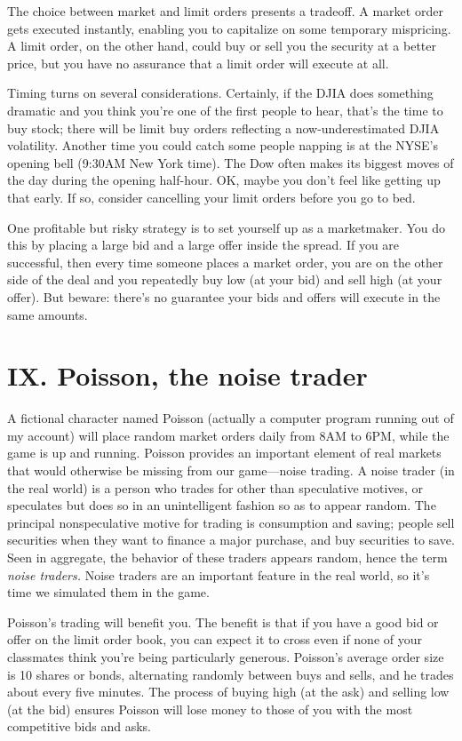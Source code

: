 The choice between market and limit orders presents a tradeoff.  A
market order gets executed instantly, enabling you to capitalize on
some temporary mispricing.  A limit order, on the other hand, could
buy or sell you the security at a better price, but you have no
assurance that a limit order will execute at all.

Timing turns on several considerations.  Certainly, if the DJIA does
something dramatic and you think you're one of the first people to
hear, that's the time to buy stock; there will be limit buy orders
reflecting a now-underestimated DJIA volatility.  Another time you
could catch some people napping is at the NYSE's opening bell (9:30AM
New York time).  The Dow often makes its biggest moves of the day
during the opening half-hour.  OK, maybe you don't feel like getting
up that early.  If so, consider cancelling your limit orders before
you go to bed.

One profitable but risky strategy is to set yourself up as a
marketmaker.  You do this by placing a large bid and a large offer
inside the spread.  If you are successful, then every time someone
places a market order, you are on the other side of the deal and you
repeatedly buy low (at your bid) and sell high (at your offer).  But
beware: there's no guarantee your bids and offers will execute in the
same amounts.

\section{IX. Poisson, the noise trader}%
A fictional character named Poisson (actually a computer program
running out of my account) will place random market orders daily from
8AM to 6PM, while the game is up and running.  Poisson provides an
important element of real markets that would otherwise be missing
from our game---noise trading.  A noise trader (in the real world) is
a person who trades for other than speculative motives, or speculates
but does so in an unintelligent fashion so as to appear random.  The
principal nonspeculative motive for trading is consumption and
saving; people sell securities when they want to finance a major
purchase, and buy securities to save.  Seen in aggregate, the
behavior of these traders appears random, hence the term {\it noise
traders.} Noise traders are an important feature in the real world,
so it's time we simulated them in the game.

Poisson's trading will benefit you.  The benefit is that if you have
a good bid or offer on the limit order book, you can expect it to
cross even if none of your classmates think you're being particularly
generous.  Poisson's average order size is 10 shares or bonds,%
alternating randomly between buys and sells, and he trades about
every five minutes.  The process of buying high (at the ask) and
selling low (at the bid) ensures Poisson will lose money to those of
you with the most competitive bids and asks.

